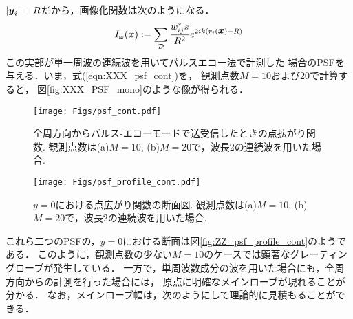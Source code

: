 $|\mbox{\boldmath $y$}_i|=R$だから，画像化関数は次のようになる．
\begin{equation}
	I_\omega(\mbox{\boldmath $x$})
		:=
	\sum_{\cal D} 
	\frac{w_{ij}^*s}{R^2}
	e^{
	2ik
	\left(
		r_i(\mbox{\boldmath $x$})-R
	\right)
	}
	\label{eqn:XXX_PSF_cont}
\end{equation}
この実部が単一周波の連続波を用いてパルスエコー法で計測した
場合のPSFを与える．いま，式(\ref{eqn:XXX_psf_cont})を，
観測点数$M=10$および20で計算すると，
図\ref{fig:XXX_PSF_mono}のような像が得られる．
\begin{figure}[h]
	\begin{center}
	\texttt{[image: Figs/psf\_cont.pdf]} 
	\end{center}
	\caption{
	全周方向からパルス-エコーモードで送受信したときの点拡がり関数.
	観測点数は(a)$M=10$, (b)$M=20$で，波長2の連続波を用いた場合.} 
	\label{fig:XXX_psf_cont}
\end{figure}
\begin{figure}[h]
	\begin{center}
	\texttt{[image: Figs/psf\_profile\_cont.pdf]} 
	\end{center}
	\caption{$y=0$における点広がり関数の断面図. 
	観測点数は(a)$M=10$, (b)$M=20$で，波長2の連続波を用いた場合.}
	\label{fig:XXX_psf_profile_cont}
\end{figure}
これら二つのPSFの，$y=0$における断面は図\ref{fig:ZZ_psf_profile_cont}のようである．
このように，観測点数の少ない$M=10$のケースでは顕著なグレーティングローブが発生している．
一方で，単周波数成分の波を用いた場合にも，全周方向からの計測を行った場合には，
原点に明確なメインローブが現れることが分かる．
なお，メインローブ幅は，次のようにして理論的に見積もることができる．


